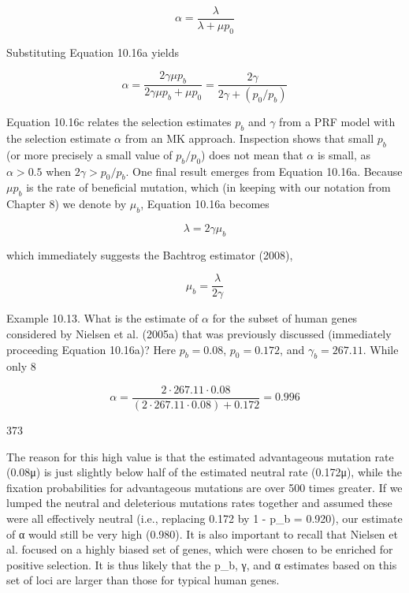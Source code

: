 \documentclass{article}
\begin{document}
\begin{equation}
\alpha=\frac{\lambda}{\lambda+\mu p_{0}}
\tag{10.16b}
\label{eq:10_16b}
\end{equation}

Substituting Equation 10.16a yields

\begin{equation}
\alpha=\frac{2\gamma\mu p_{b}}{2\gamma\mu p_{b}+\mu p_{0}}=\frac{2\gamma}{2\gamma+(p_{0}/p_{b})}
\tag{10.16c}
\label{eq:10_16c}
\end{equation}

Equation 10.16c relates the selection estimates  $ p_b $ and  $ \gamma $ from a PRF model with the selection estimate  $ \alpha $ from an MK approach. Inspection shows that small  $ p_b $ (or more precisely a small value of  $ p_b/p_0 $) does not mean that  $ \alpha $ is small, as  $ \alpha > 0.5 $ when  $ 2\gamma > p_0/p_b $. One final result emerges from Equation 10.16a. Because  $ \mu p_b $ is the rate of beneficial mutation, which (in keeping with our notation from Chapter 8) we denote by  $ \mu_b $, Equation 10.16a becomes

\begin{equation}
\lambda=2\gamma\mu_{b}
\tag{10.16d}
\label{eq:10_16d}
\end{equation}

which immediately suggests the Bachtrog estimator (2008),

\begin{equation}
\mu_{b}=\frac{\lambda}{2\gamma}
\tag{10.16e}
\label{eq:10_16e}
\end{equation}

Example 10.13. What is the estimate of  $ \alpha $ for the subset of human genes considered by Nielsen et al. (2005a) that was previously discussed (immediately proceeding Equation 10.16a)? Here  $ p_b = 0.08 $,  $ p_0 = 0.172 $, and  $ \gamma_b = 267.11 $. While only 8%

\begin{equation}
\alpha=\frac{2\cdot267.11\cdot0.08}{(2\cdot267.11\cdot0.08)+0.172}=0.996
\end{equation}

373

The reason for this high value is that the estimated advantageous mutation rate (0.08μ) is just slightly below half of the estimated neutral rate (0.172μ), while the fixation probabilities for advantageous mutations are over 500 times greater. If we lumped the neutral and deleterious mutations rates together and assumed these were all effectively neutral (i.e., replacing 0.172 by 1 - p_b = 0.920), our estimate of α would still be very high (0.980). It is also important to recall that Nielsen et al. focused on a highly biased set of genes, which were chosen to be enriched for positive selection. It is thus likely that the p_b, γ, and α estimates based on this set of loci are larger than those for typical human genes.
\end{document}
